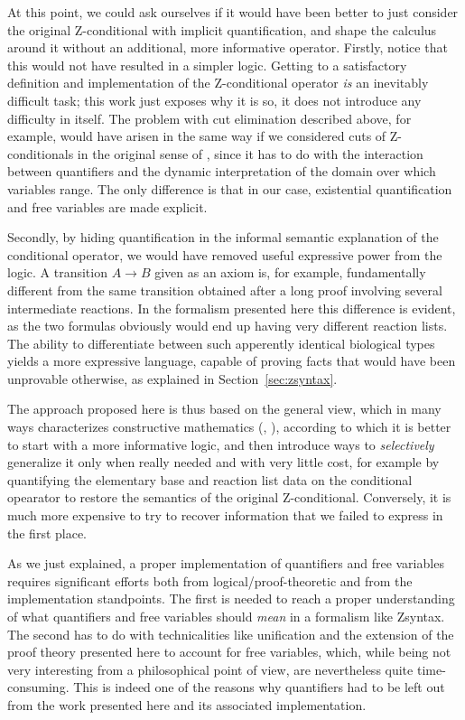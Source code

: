 At this point, we could ask ourselves if it would have been better to just
consider the original Z-conditional with implicit quantification, and shape the
calculus around it without an additional, more informative operator. Firstly,
notice that this would not have resulted in a simpler logic. Getting to a
satisfactory definition and implementation of the Z-conditional operator
\emph{is} an inevitably difficult task; this work just exposes why it is so, it
does not introduce any difficulty in itself. The problem with cut elimination
described above, for example, would have arisen in the same way if we considered
cuts of Z-conditionals in the original sense of \cite{adding-logic}, since it
has to do with the interaction between quantifiers and the dynamic
interpretation of the domain over which variables range. The only difference is
that in our case, existential quantification and free variables are made
explicit.

Secondly, by hiding quantification in the informal semantic explanation of the
conditional operator, we would have removed useful expressive power from the
logic. A transition $A \rightarrow B$ given as an axiom is, for example,
fundamentally different from the same transition obtained after a long proof
involving several intermediate reactions. In the formalism presented here this
difference is evident, as the two formulas obviously would end up having very
different reaction lists. The ability to differentiate between such apperently
identical biological types yields a more expressive language, capable of proving
facts that would have been unprovable otherwise, as explained in
Section~\ref{sec:zsyntax}.

The approach proposed here is thus based on the general view, which in many ways
characterizes constructive mathematics (\cite{richman}, \cite{unif}), according
to which it is better to start with a more informative logic, and then introduce
ways to \emph{selectively} generalize it only when really needed and with very
little cost, for example by quantifying the elementary base and reaction list
data on the conditional opearator to restore the semantics of the original
Z-conditional. Conversely, it is much more expensive to try to recover
information that we failed to express in the first place.

As we just explained, a proper implementation of quantifiers and free variables
requires significant efforts both from logical/proof-theoretic and from the
implementation standpoints. The first is needed to reach a proper understanding
of what quantifiers and free variables should \emph{mean} in a formalism like
Zsyntax. The second has to do with technicalities like unification and the
extension of the proof theory presented here to account for free variables,
which, while being not very interesting from a philosophical point of view, are
nevertheless quite time-consuming. This is indeed one of the reasons why
quantifiers had to be left out from the work presented here and its associated
implementation.

